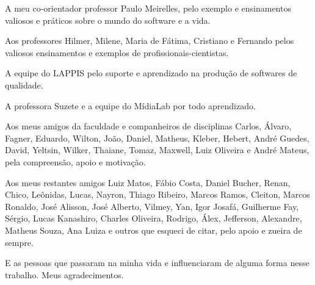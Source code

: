 \begin{agradecimentos}
A meu co-orientador professor Paulo Meirelles, pelo exemplo e ensinamentos valiosos e práticos sobre o mundo do software e a vida.

Aos professores Hilmer, Milene, Maria de Fátima, Cristiano e Fernando pelos valiosos ensinamentos e exemplos de profissionais-cientistas.

A equipe do LAPPIS pelo suporte e aprendizado na produção de softwares de qualidade.

A professora Suzete e a equipe do MídiaLab por todo aprendizado.

Aos meus amigos da faculdade e companheiros de disciplinas Carlos, Álvaro, Fagner, Eduardo, Wilton, João, Daniel, Matheus, Kleber, Hebert, André Guedes, David, Yeltsin, Wilker, Thaiane, Tomaz, Maxwell, Luiz Oliveira e  André Mateus, pela compreensão, apoio e motivação.

Aos meus restantes amigos Luiz Matos, Fábio Costa, Daniel Bucher, Renan, Chico, Leônidas, Lucas, Nayron, Thiago Ribeiro, Marcos Ramos, Cleiton, Marcos Ronaldo, José Alisson, José Alberto, Vilmey, Yan, Igor Josafá, Guilherme Fay, Sérgio, Lucas Kanashiro, Charles Oliveira, Rodrigo, Álex, Jefferson, Alexandre, Matheus Souza, Ana Luiza e outros que esqueci de citar, pelo apoio e zueira de sempre.

E as pessoas que passaram na minha vida e influenciaram de alguma forma nesse trabalho. Meus agradecimentos.





\end{agradecimentos}
